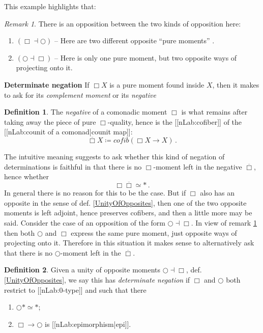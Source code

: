 \documentclass[12pt,titlepage]{article}
\theoremstyle{plain}
\theoremstyle{definition}
\newtheorem{defn}{Definition}
\theoremstyle{remark}
\newtheorem{remark}{Remark}
\begin{document}
This example highlights that:
\begin{remark}
\label{TheTwoKindsOfOpposites}\hypertarget{TheTwoKindsOfOpposites}{}
There is an opposition between the two kinds of opposition here:
\begin{enumerate}%
\item $(\Box \dashv \bigcirc)$ -- Here are two different opposite ``pure moments'' .
\item $(\bigcirc \dashv \Box)$ -- Here is only one pure moment, but two opposite ways of projecting onto it.
\end{enumerate}
\end{remark}
\textbf{Determinate negation}
If $\Box X$ is a pure moment found inside $X$, then it makes to ask for its \emph{complement moment} or its \emph{negative}
\begin{defn}
\label{NegativeMoment}\hypertarget{NegativeMoment}{}
The \emph{negative} of a comonadic moment $\Box$ is what remains after taking away the piece of pure $\Box$-quality, hence is the [[nLab:cofiber]] of the [[nLab:counit of a comonad|counit map]]:
\begin{displaymath}
\overline{\Box} X \coloneqq cofib(\Box X \to X)
  \,.
\end{displaymath}
\end{defn}
The intuitive meaning suggests to ask whether this kind of negation of determinations is faithful in that there is no $\Box$-moment left in the negative $\overline{\Box}$, hence whether
\begin{displaymath}
\Box \overline{\Box} \simeq \ast
  \,.
\end{displaymath}
In general there is no reason for this to be the case. But if $\Box$ also has an opposite in the sense of def. \ref{UnityOfOpposites}, then one of the two opposite moments is left adjoint, hence preserves cofibers, and then a little more may be said.
Consider the case of an opposition of the form $\bigcirc \dashv \Box$. In view of remark \ref{TheTwoKindsOfOpposites} then both $\bigcirc$ and $\Box$ express the same pure moment, just opposite ways of projecting onto it. Therefore in this situation it makes sense to alternatively ask that there is no $\bigcirc$-moment left in the $\overline{\Box}$.
\begin{defn}
\label{CompleteOpposition}\hypertarget{CompleteOpposition}{}
Given a unity of opposite moments $\bigcirc \dashv \Box$, def. \ref{UnityOfOpposites}, we say this has \emph{determinate negation} if $\Box$ and $\bigcirc$ both restrict to [[nLab:0-type]] and such that there
\begin{enumerate}%
\item $\bigcirc \ast \simeq \ast$;
\item $\Box  \longrightarrow \bigcirc$ is [[nLab:epimorphism|epi]].
\end{enumerate}
\end{defn}
\end{document}
